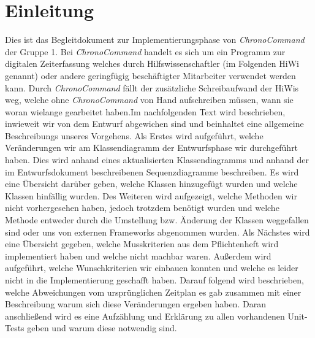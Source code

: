 \section{Einleitung}

Dies ist das Begleitdokument zur Implementierungsphase von \emph{ChronoCommand} der Gruppe 1. Bei \emph{ChronoCommand} handelt
es sich um ein Programm zur digitalen Zeiterfassung welches durch Hilfswissenschaftler (im Folgenden HiWi genannt) oder andere
geringfügig beschäftigter Mitarbeiter verwendet werden kann. Durch \emph{ChronoCommand} fällt der zusätzliche Schreibaufwand der HiWis weg, welche ohne
\emph{ChronoCommand} von Hand aufschreiben müssen, wann sie woran wielange gearbeitet haben.Im nachfolgenden Text wird 
beschrieben, inwieweit wir von dem Entwurf abgewichen sind und beinhaltet eine allgemeine Beschreibungs unseres Vorgehens.
Als Erstes wird aufgeführt, welche Veränderungen wir am Klassendiagramm der Entwurfsphase wir durchgeführt haben. 
Dies wird anhand eines aktualisierten Klassendiagramms und anhand der im Entwurfsdokument beschreibenen Sequenzdiagramme 
beschreiben. Es wird eine Übersicht darüber geben, welche Klassen hinzugefügt wurden und welche Klassen hinfällig wurden. Des 
Weiteren wird aufgezeigt, welche Methoden wir nicht vorhergesehen haben, jedoch trotzdem benötigt wurden und welche Methode 
entweder durch die Umstellung bzw. Änderung der Klassen weggefallen sind oder uns von externen Frameworks abgenommen wurden.
Als Nächstes wird eine Übersicht gegeben, welche Musskriterien aus dem Pflichtenheft wird implementiert haben und welche nicht
machbar waren. Außerdem wird aufgeführt, welche Wunschkriterien wir einbauen konnten und welche es leider nicht in die 
Implementierung geschafft haben. Darauf folgend wird beschrieben, welche Abweichungen vom ursprünglichen Zeitplan es gab 
zusammen mit einer Beschreibung warum sich diese Veränderungen ergeben haben. Daran anschließend wird es eine Aufzählung und Erklärung zu allen vorhandenen Unit-Tests geben und warum diese notwendig sind.
